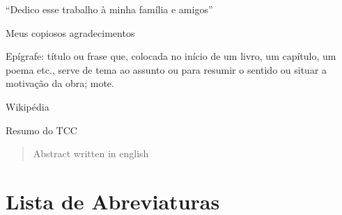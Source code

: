 \documentclass{ufpatcc}
\begin{document}
\ufpaPaginaDeRosto


\ufpaPagRostodo 

\ufpaPaginaDeAprovacao


\begin{ufpaOferecimento}

    “Dedico esse trabalho à minha família e amigos”

\end{ufpaOferecimento}


\begin{ufpaAgradecimentos}

    Meus copiosos agradecimentos

    
\end{ufpaAgradecimentos}


\begin{ufpaEpigrafe}
    Epígrafe: título ou frase que, colocada no início de um livro, um capítulo, um
    poema etc., serve de tema ao assunto ou para resumir o sentido ou situar a
    motivação da obra; mote.
    \begin{flushright}Wikipédia\end{flushright}
\end{ufpaEpigrafe}


\begin{ufpaResumo}

    Resumo do TCC

\end{ufpaResumo}

\begin{abstract}

    Abstract written in english

\end{abstract}


\chapter*{Lista de Abreviaturas} \label{sec:siglas}
 \label{sec:siglas} 
\clearpage
\end{document}
